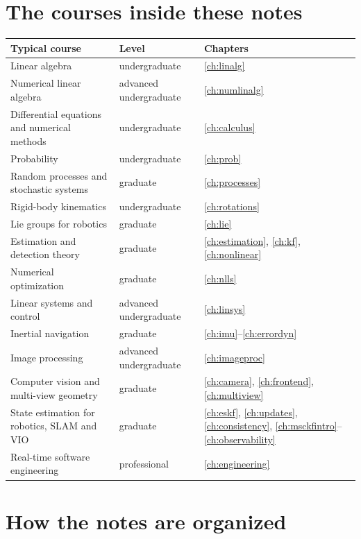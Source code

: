 \section*{The courses inside these notes}

\begin{center}\small
\begin{tabularx}{\textwidth}{@{}>{\raggedright\arraybackslash}p{}>{\raggedright\arraybackslash}X l@{}}
\toprule
\textbf{Typical course} & \textbf{Level} & \textbf{Chapters} \\
\midrule
Linear algebra & undergraduate & \ref{ch:linalg} \\
Numerical linear algebra & advanced undergraduate & \ref{ch:numlinalg} \\
Differential equations and numerical methods & undergraduate & \ref{ch:calculus} \\
Probability & undergraduate & \ref{ch:prob} \\
Random processes and stochastic systems & graduate & \ref{ch:processes} \\
Rigid-body kinematics & undergraduate & \ref{ch:rotations} \\
Lie groups for robotics & graduate & \ref{ch:lie} \\
Estimation and detection theory & graduate & \ref{ch:estimation}, \ref{ch:kf}, \ref{ch:nonlinear} \\
Numerical optimization & graduate & \ref{ch:nlls} \\
Linear systems and control & advanced undergraduate & \ref{ch:linsys} \\
Inertial navigation & graduate & \ref{ch:imu}--\ref{ch:errordyn} \\
Image processing & advanced undergraduate & \ref{ch:imageproc} \\
Computer vision and multi-view geometry & graduate & \ref{ch:camera}, \ref{ch:frontend}, \ref{ch:multiview} \\
State estimation for robotics, SLAM and VIO & graduate & \ref{ch:eskf}, \ref{ch:updates}, \ref{ch:consistency}, \ref{ch:msckfintro}--\ref{ch:observability} \\
Real-time software engineering & professional & \ref{ch:engineering} \\
\bottomrule
\end{tabularx}
\end{center}

\section*{How the notes are organized}

